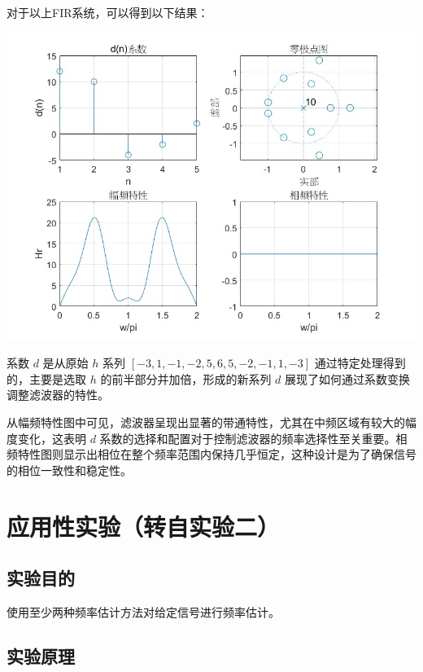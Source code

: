 \documentclass[a4paper,12pt]{article}
\begin{document}
\begin{itemize}
\begin{lstlisting}
    \end{lstlisting}

对于以上FIR系统，可以得到以下结果：

\centering 
\includegraphics[width=0.8\linewidth]{images/3_Verify/fir4.jpg}
\justifying

系数 \( d \) 是从原始 \( h \) 系列 \( [-3, 1, -1, -2, 5, 6, 5, -2, -1, 1, -3] \) 通过特定处理得到的，主要是选取 \( h \) 的前半部分并加倍，形成的新系列 \( d \) 展现了如何通过系数变换调整滤波器的特性。

从幅频特性图中可见，滤波器呈现出显著的带通特性，尤其在中频区域有较大的幅度变化，这表明 \( d \) 系数的选择和配置对于控制滤波器的频率选择性至关重要。相频特性图则显示出相位在整个频率范围内保持几乎恒定，这种设计是为了确保信号的相位一致性和稳定性。

\end{itemize}


\newpage

\section{应用性实验（转自实验二）}
\subsection{实验目的}
使用至少两种频率估计方法对给定信号进行频率估计。

\subsection{实验原理}
\end{document}
